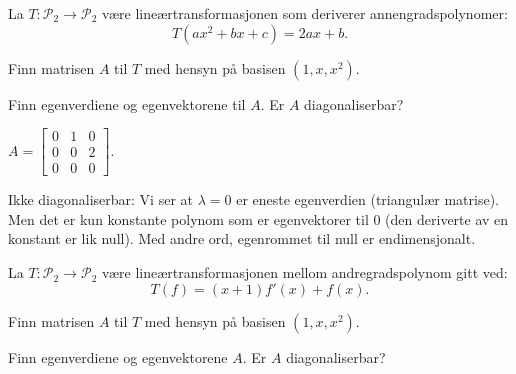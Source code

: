 \begin{oppgave}
La $T:\mathcal{P}_2\rightarrow \mathcal{P}_2$ være lineærtransformasjonen som deriverer annengradspolynomer: $$T(ax^2+bx+c)=2ax+b.$$

\begin{punkt}
Finn matrisen $A$ til $T$ med hensyn på basisen $(1,x,x^2)$.
\end{punkt}

\begin{punkt}
Finn egenverdiene og egenvektorene til $A$. Er $A$ diagonaliserbar?
\end{punkt}

\end{oppgave}

\begin{losning}

\begin{punkt}
$A=\begin{bmatrix}
0 & 1 & 0\\
0 & 0 & 2\\
0 & 0 & 0
\end{bmatrix}$.
\end{punkt}

\begin{punkt}
Ikke diagonaliserbar: Vi ser at $\lambda=0$ er eneste egenverdien (triangulær matrise). Men det er kun konstante polynom som er egenvektorer til 0 (den deriverte av en konstant er lik null). Med andre ord, egenrommet til null er endimensjonalt.
\end{punkt}
\end{losning}



\begin{oppgave}
La $T:\mathcal{P}_2\rightarrow \mathcal{P}_2$ være lineærtransformasjonen mellom andregradspolynom gitt ved: $$T(f)=(x+1)f'(x)+f(x).$$

\begin{punkt}
Finn matrisen $A$ til $T$ med hensyn på basisen $(1,x,x^2)$.
\end{punkt}


\begin{punkt}
Finn egenverdiene og egenvektorene $A$. Er $A$ diagonaliserbar?
\end{punkt}
\end{oppgave}


